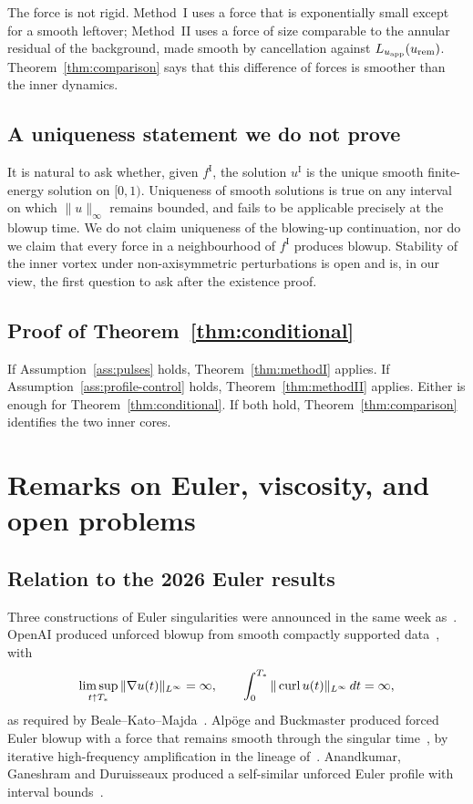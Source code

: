 The force is not rigid. Method~I uses a force that is exponentially small except for a smooth leftover; Method~II uses a force of size comparable to the annular residual of the background, made smooth by cancellation against $L_{u_{\mathrm{app}}}(u_{\mathrm{rem}})$. Theorem~\ref{thm:comparison} says that this difference of forces is smoother than the inner dynamics.

\subsection{A uniqueness statement we do not prove}

It is natural to ask whether, given $f^{\mathrm I}$, the solution $u^{\mathrm I}$ is the unique smooth finite-energy solution on $[0,1)$. Uniqueness of smooth solutions is true on any interval on which $\|u\|_\infty$ remains bounded, and fails to be applicable precisely at the blowup time. We do not claim uniqueness of the blowing-up continuation, nor do we claim that every force in a neighbourhood of $f^{\mathrm I}$ produces blowup. Stability of the inner vortex under non-axisymmetric perturbations is open and is, in our view, the first question to ask after the existence proof.

\subsection{Proof of Theorem~\ref{thm:conditional}}

If Assumption~\ref{ass:pulses} holds, Theorem~\ref{thm:methodI} applies. If Assumption~\ref{ass:profile-control} holds, Theorem~\ref{thm:methodII} applies. Either is enough for Theorem~\ref{thm:conditional}. If both hold, Theorem~\ref{thm:comparison} identifies the two inner cores.

\section{Remarks on {E}uler, viscosity, and open problems}
\label{sec:remarks}

\subsection{Relation to the 2026 {E}uler results}

Three constructions of {E}uler singularities were announced in the same week as~\cite{openai2026ns}. {O}pen{AI} produced unforced blowup from smooth compactly supported data~\cite{openai2026euler}, with
\[
\limsup_{t\uparrow T_*}\|\nabla u(t)\|_{L^\infty}=\infty,
\qquad
\int_0^{T_*}\|\operatorname{curl} u(t)\|_{L^\infty}\,dt=\infty,
\]
as required by {B}eale--{K}ato--{M}ajda~\cite{bkm1984}. {A}lp{\"o}ge and {B}uckmaster produced forced {E}uler blowup with a force that remains smooth through the singular time~\cite{alpoegbuckmaster2026}, by iterative high-frequency amplification in the lineage of~\cite{cmz2023}. {A}nandkumar, {G}aneshram and {D}uruisseaux produced a self-similar unforced {E}uler profile with interval bounds~\cite{anandkumar2026}.

